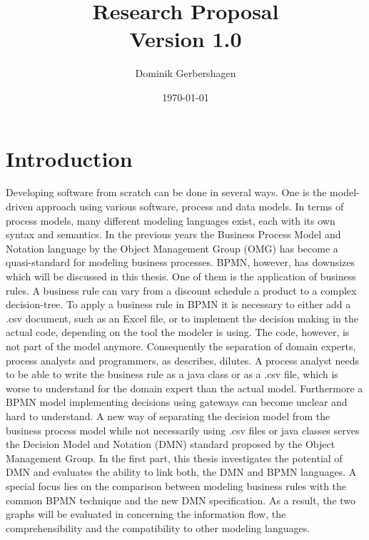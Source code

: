 \documentclass[11pt,a4paper,draft]{article}
\title{Research Proposal \\ \large Version 1.0}
\author{Dominik Gerbershagen}
\affil{Chair for Application and Middleware Systems\\ Department of Informatics\\ Technische Universität München}
\date{\today}
\begin{document}
\maketitle
\section{Introduction}
Developing software from scratch can be done in several ways. One is the model-driven approach using various software, process and data models. In terms of process models, many different modeling languages exist, each with its own syntax and semantics. In the previous years the Business Process Model and Notation language by the Object Management Group (OMG) has become a quasi-standard for modeling business processes. 
BPMN, however, has downsizes which will be discussed in this thesis. One of them is the application of business rules. 
A business rule can vary from a discount schedule  a product to a complex decision-tree. To apply a business rule in BPMN it is necessary to either add a .csv document, such as an Excel file, or to implement the decision making in the actual code, depending on the tool the modeler is using. The code, however, is not part of the model anymore. Consequently the separation of domain experts, process analysts and programmers, as \citep[see chapter 5]{Dumas2013} describes, dilutes. A process analyst needs to be able to write the business rule as a java class or as a .csv file, which is worse to understand for the domain expert than the actual model. Furthermore a BPMN model implementing decisions using gateways can become unclear and hard to understand. 
A new way of separating the decision model from the business process model while not necessarily using .csv files or java classes serves the Decision Model and Notation (DMN) standard proposed by the Object Management Group. In the first part, this thesis investigates the potential of DMN and evaluates the ability to link both, the DMN and BPMN languages. A special focus lies on the comparison between modeling business rules with the common BPMN technique and the new DMN specification. As a result, the two graphs will be evaluated in concerning the information flow, the comprehensibility and the compatibility to other modeling languages. 
\end{document}
